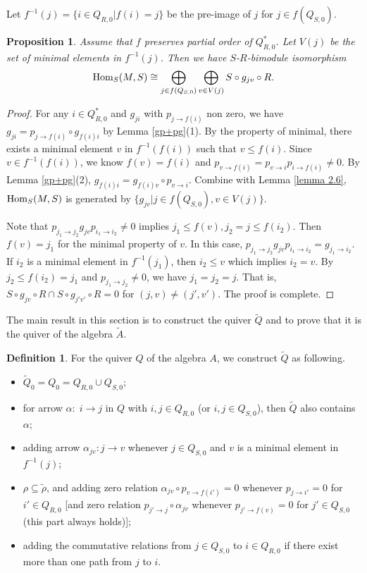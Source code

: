 \documentclass[a4paper, reqno]{amsart}
\newtheorem{prop}[thm]{Proposition}
\theoremstyle{definition}
\newtheorem{defn}[thm]{Definition}
\theoremstyle{remark}
\numberwithin{equation}{section}
\begin{document}
Let $f^{-1}(j) = \{ i\in Q_{R,0}|f(i) = j\} $ be the pre-image of $j$ for $j\in f(Q_{S,0})$.

\begin{prop}
Assume that $f$ preserves partial order of $Q_{R,0}^{*}$. Let $V(j)$ be the set of minimal elements in $f^{-1}(j)$. Then we have $S$-$R$-bimodule isomorphism 
$$\textup{Hom}_S(M,S) \cong \bigoplus_{j\in f(Q_{S,0})}\bigoplus_{v\in V(j)} S \circ g_{jv} \circ R. $$ 
\end{prop}

{\color{blue}\begin{proof}
For any $i\in Q_{R,0}^{*}$ and $g_{ji}$ with $p_{j\to f(i)}$ non zero, we have $g_{ji}=p_{j\to f(i)}\circ g_{f(i)i}$ by Lemma \ref{gp+pg}(1). By the property of minimal, there exists a minimal element $v$ in $f^{-1}(f(i))$ such that $v\leq f(i)$. Since $v\in f^{-1}(f(i))$, we know $f(v)=f(i)$ and $p_{v\to f(i)}=p_{v\to i}p_{i\to f(i)}\neq0$. By Lemma \ref{gp+pg}(2), $g_{f(i)i}=g_{f(i)v}\circ p_{v\to i}$. Combine with Lemma \ref{lemma 2.6}, $\textup{Hom}_S(M,S)$ is generated by $\{g_{jv}|j\in f(Q_{S,0}),v\in V(j)\}$.

Note that $p_{j_1\to j_2}g_{jv}p_{i_1\to i_2}\neq0$ implies $j_1\leq f(v),j_2=j\leq f(i_2)$. Then $f(v)=j_1$ for the minimal property of $v$. In this case, $p_{j_1\to j_2}g_{jv}p_{i_1\to i_2}=g_{j_1\to i_2}$. If $i_2$ is a minimal element in $f^{-1}(j_1)$, then $i_2\leq v$ which implies $i_2=v$. By $j_2\leq f(i_2)=j_1$ and $p_{j_1\to j_2}\neq0$, we have $j_1=j_2=j$. That is, $S \circ g_{jv} \circ R\cap S \circ g_{j'v'} \circ R=0$ for $(j,v)\neq(j',v')$. The proof is complete.\end{proof}}

The main result in this section is to construct the quiver $\tilde{Q}$ and to prove that it is the quiver of the algebra $\tilde{A}$.

\begin{defn}
For the quiver $Q$ of the algebra $A$, we construct $\tilde{Q}$ as following.
\begin{itemize}
    \item $\tilde{Q}_0=Q_0=Q_{R,0}\cup Q_{S,0}$;
    \item for arrow $\alpha:\;i\rightarrow j$ in $Q$ with $i,j\in Q_{R,0}$ (or $i,j\in Q_{S,0}$), then $\tilde{Q}$ also contains $\alpha$;
    \item adding arrow $\alpha_{jv} : j \to v $ whenever $j\in Q_{S,0}$ and $v$ is a minimal element in $f^{-1}(j)$; 
    \item  $\rho\subseteq \tilde{\rho}$, and adding zero relation $\alpha_{jv}\circ p_{v\to f(i')} =0 $ whenever $p_{j\to i'}=0$ for $i' \in Q_{R,0}$ [and zero relation $p_{j'\to j}\circ\alpha_{jv}$ whenever $p_{j'\to f(v)}=0$ for $j' \in Q_{S,0}$(this part always holds)]; 
    \item adding the commutative relations from $j\in Q_{S,0}$ to $i\in Q_{R,0}$ if there exist more than one path from $j$ to $i$.
\end{itemize}
\end{defn}
\end{document}
